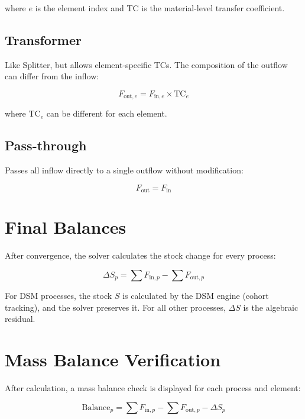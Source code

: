 where $e$ is the element index and TC is the material-level transfer coefficient.

\subsection{Transformer}

Like Splitter, but allows element-specific TCs. The composition of the outflow can differ from the inflow:

\begin{equation}
  F_{\text{out},e} = F_{\text{in},e} \times \text{TC}_{e}
\end{equation}

where $\text{TC}_e$ can be different for each element.

\subsection{Pass-through}

Passes all inflow directly to a single outflow without modification:

\begin{equation}
  F_{\text{out}} = F_{\text{in}}
\end{equation}

\section{Final Balances}

After convergence, the solver calculates the stock change for every process:

\begin{equation}
  \Delta S_p = \sum F_{\text{in},p} - \sum F_{\text{out},p}
\end{equation}

For DSM processes, the stock $S$ is calculated by the DSM engine (cohort tracking), and the solver preserves it. For all other processes, $\Delta S$ is the algebraic residual.

\section{Mass Balance Verification}

After calculation, a mass balance check is displayed for each process and element:

\begin{equation}
  \text{Balance}_p = \sum F_{\text{in},p} - \sum F_{\text{out},p} - \Delta S_p
\end{equation}

